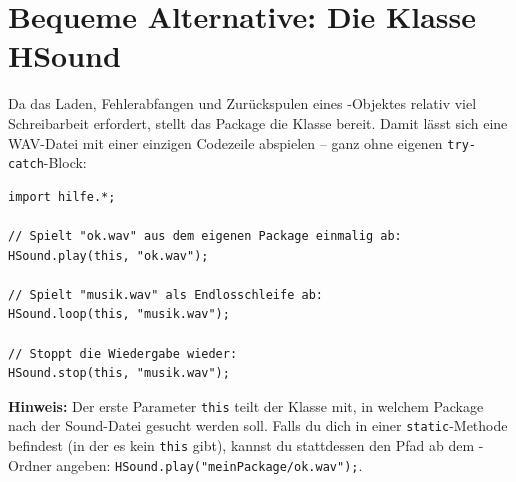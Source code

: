 \section{Bequeme Alternative: Die Klasse HSound}

Da das Laden, Fehlerabfangen und Zurückspulen eines -Objektes
relativ viel Schreibarbeit erfordert, stellt das Package  die
Klasse  bereit. Damit lässt sich eine WAV-Datei mit einer
einzigen Codezeile abspielen -- ganz ohne eigenen \lstinline|try-catch|-Block:

\begin{lstlisting}
import hilfe.*;

// Spielt "ok.wav" aus dem eigenen Package einmalig ab:
HSound.play(this, "ok.wav");

// Spielt "musik.wav" als Endlosschleife ab:
HSound.loop(this, "musik.wav");

// Stoppt die Wiedergabe wieder:
HSound.stop(this, "musik.wav");
\end{lstlisting}

\noindent \textbf{Hinweis:} Der erste Parameter \lstinline|this| teilt der
Klasse  mit, in welchem Package nach der Sound-Datei gesucht
werden soll. Falls du dich in einer \lstinline|static|-Methode befindest (in
der es kein \lstinline|this| gibt), kannst du stattdessen den Pfad ab dem
-Ordner angeben: \lstinline|HSound.play("meinPackage/ok.wav");|.
